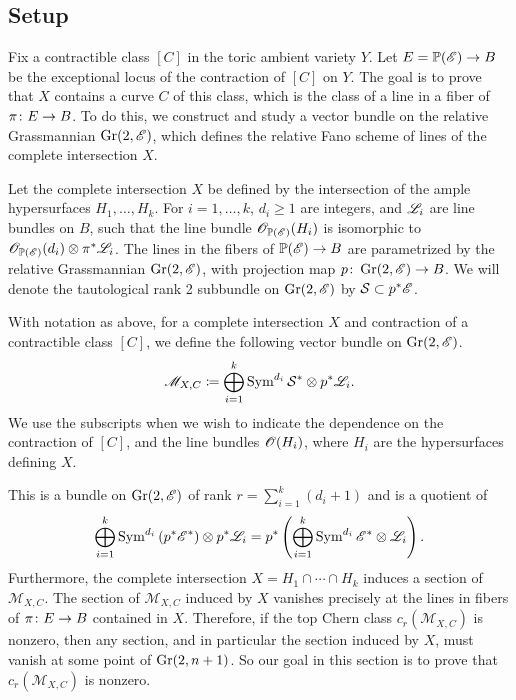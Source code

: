 

\subsection{Setup}
Fix a contractible class $[C]$ in the toric ambient variety $Y$. Let $E = \mathbb{P}(\mathscr{E}) \to B$ be the exceptional locus of the contraction of $[C]$ on $Y$. The goal is to prove that $X$ contains a curve $C$ of this class, which is the class of a line in a fiber of $\pi \colon E \to B$. To do this, we construct and study a vector bundle on the relative Grassmannian $\operatorname{Gr}(2,\mathscr{E})$, which defines the relative Fano scheme of lines of the complete intersection $X$.  

Let the complete intersection $X$ be defined by the intersection of the ample hypersurfaces $H_1, \dots, H_k$. For $i= 1,\dots,k$, $d_i \geq 1$ are integers, and $\mathscr{L}_i$ are line bundles on $B$, such that the line bundle $\mathscr{O}_{\mathbb{P}(\mathscr{E})}(H_i)$ is isomorphic to $\mathscr{O}_{\mathbb{P}(\mathscr{E})}(d_i) \otimes \pi^*\mathscr{L}_i$. The lines in the fibers of $\mathbb{P}(\mathscr{E}) \to B$ are parametrized by the relative Grassmannian $\operatorname{Gr}(2,\mathscr{E})$, with projection map $p \colon \operatorname{Gr}(2,\mathscr{E}) \to B$. We will denote the tautological rank 2 subbundle on $\operatorname{Gr}(2,\mathscr{E})$ by $\mathcal{S} \subset p^*\mathscr{E}$.

\begin{definition}
\label{def:MDefinition}
With notation as above, for a complete intersection $X$ and contraction of a contractible class $[C]$, we define the following vector bundle on $\operatorname{Gr}(2,\mathscr{E})$.
\begin{equation}
  \label{eq:MDefinition}
  \mathscr{M}_{X,C} \coloneqq \bigoplus_{i=1}^k \operatorname{Sym}^{d_i} \mathcal{S}^* \otimes p^*\mathscr{L}_i.
\end{equation}
We use the subscripts when we wish to indicate the dependence on the contraction of $[C]$, and the line bundles $\mathscr{O}(H_i)$, where $H_i$ are the hypersurfaces defining $X$.
\end{definition}

This is a bundle on $\operatorname{Gr}(2,\mathscr{E})$ of rank $r = \sum_{i=1}^k (d_i+1)$ and is a quotient of
\[\bigoplus_{i=1}^k \operatorname{Sym}^{d_i}\left(p^*\mathscr{E}^* \right) \otimes p^*\mathscr{L}_i = p^* \left(\bigoplus_{i=1}^k \operatorname{Sym}^{d_i}\mathscr{E}^* \otimes \mathscr{L}_i \right). \]
Furthermore, the complete intersection $X = H_1 \cap \cdots \cap H_k$ induces a section of $\mathscr{M}_{X,C}$. The section of $\mathscr{M}_{X,C}$ induced by $X$ vanishes precisely at the lines in fibers of $\pi \colon E \to B$ contained in $X$. Therefore, if the top Chern class $c_r(\mathscr{M}_{X,C})$ is nonzero, then any section, and in particular the section induced by $X$, must vanish at some point of $\operatorname{Gr}(2,n+1)$. So our goal in this section is to prove that $c_r(\mathscr{M}_{X,C})$ is nonzero.


